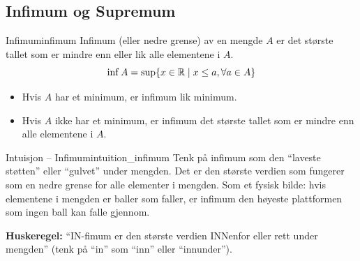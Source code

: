 \subsection{Infimum og Supremum}
\begin{definition}{Infimum}{infimum}
	Infimum (eller nedre grense) av en mengde \(A\) er det største tallet som er mindre enn eller lik alle elementene i \(A\).
	\[
		\inf A = \sup \{x \in \mathbb{R} \mid x \leq a, \forall a \in A\}
	\]
	\begin{itemize}
		\item Hvis \(A\) har et minimum, er infimum lik minimum.
		\item Hvis \(A\) ikke har et minimum, er infimum det største tallet som er mindre enn alle elementene i \(A\).
	\end{itemize}
\end{definition}

\begin{remark}{Intuisjon -- Infimum}{intuition_infimum}
	Tenk på infimum som den \enquote{laveste støtten} eller \enquote{gulvet} under mengden. Det er den største verdien som fungerer som en nedre grense for alle elementer i mengden. Som et fysisk bilde: hvis elementene i mengden er baller som faller, er infimum den høyeste plattformen som ingen ball kan falle gjennom.

	\textbf{Huskeregel:} \enquote{IN-fimum er den største verdien INNenfor eller rett under mengden} (tenk på \enquote{in} som \enquote{inn} eller \enquote{innunder}).
\end{remark}

